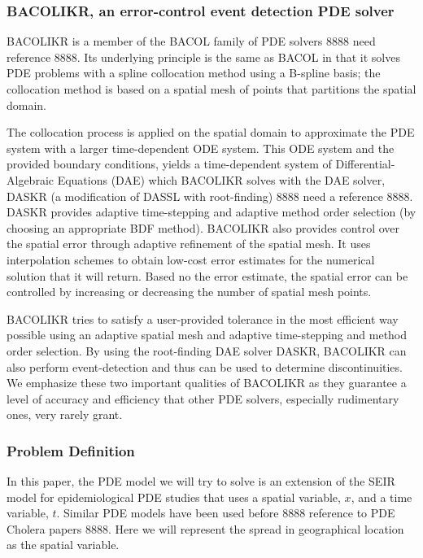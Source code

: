 \documentclass{article}
\begin{document}
\subsubsection{BACOLIKR, an error-control event detection PDE solver}
\label{subsection:pde_software}
BACOLIKR is a member of the BACOL family of PDE solvers 8888 need reference 8888. Its underlying principle is the same as BACOL in that it solves PDE problems with a spline collocation method using a B-spline basis; the collocation method is based on a spatial mesh of points that partitions the spatial domain. 

The collocation process is applied on the spatial domain to approximate the PDE system with a larger time-dependent ODE system. This ODE system and the provided boundary conditions, yields a time-dependent system of Differential-Algebraic Equations (DAE) which BACOLIKR solves with the DAE solver, DASKR (a modification of DASSL with root-finding) 8888 need a reference 8888. DASKR provides adaptive time-stepping and adaptive method order selection (by choosing an appropriate BDF method). BACOLIKR also provides control over the spatial error through adaptive refinement of the spatial mesh. It uses interpolation schemes to obtain low-cost error estimates for the numerical solution that it will return. Based no the error estimate, the spatial error can be controlled by increasing or decreasing the number of spatial mesh points.

BACOLIKR tries to satisfy a user-provided tolerance in the most efficient way possible using an adaptive spatial mesh and adaptive time-stepping and method order selection. By using the root-finding DAE solver DASKR, BACOLIKR can also perform event-detection and thus can be used to determine discontinuities. We emphasize these two important qualities of BACOLIKR as they guarantee a level of accuracy and efficiency that other PDE solvers, especially rudimentary ones, very rarely grant.

\subsubsection{Problem Definition}
\label{subsection:pde_problem_def}
In this paper, the PDE model we will try to solve is an extension of the SEIR model for epidemiological PDE studies that uses a spatial variable, $x$, and a time variable, $t$. Similar PDE models have been used before 8888 reference to PDE Cholera papers 8888. Here we will represent the spread in geographical location as the spatial variable.
\end{document}
